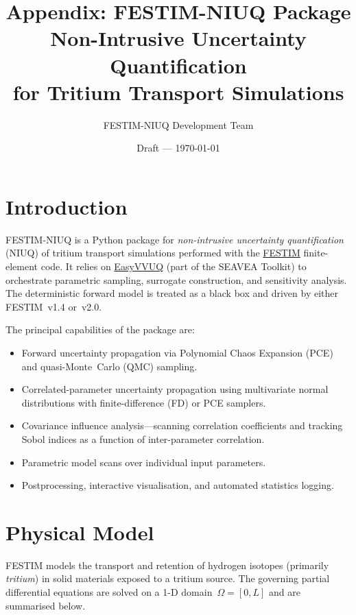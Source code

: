 \documentclass[11pt,a4paper]{article}
\title{%
  \textbf{Appendix: FESTIM-NIUQ Package}\\[4pt]
  \large Non-Intrusive Uncertainty Quantification\\
  for Tritium Transport Simulations%
}
\author{FESTIM-NIUQ Development Team}
\date{Draft — \today}
\begin{document}
\maketitle
\tableofcontents
\newpage

\section{Introduction}
\label{sec:intro}

FESTIM-NIUQ is a Python package for \emph{non-intrusive uncertainty
quantification} (NIUQ) of tritium transport simulations performed with the
\href{https://github.com/festim-dev/FESTIM}{FESTIM} finite-element code.
It relies on
\href{https://github.com/UCL-CCS/EasyVVUQ}{EasyVVUQ} (part of the SEAVEA
Toolkit) to orchestrate parametric sampling, surrogate construction, and
sensitivity analysis.  The deterministic forward model is treated as a
black box and driven by either FESTIM~v1.4 or~v2.0.

The principal capabilities of the package are:
\begin{itemize}[nosep]
  \item Forward uncertainty propagation via Polynomial Chaos Expansion (PCE)
        and quasi-Monte~Carlo (QMC) sampling.
  \item Correlated-parameter uncertainty propagation using multivariate
        normal distributions with finite-difference (FD) or PCE samplers.
  \item Covariance influence analysis---scanning correlation coefficients
        and tracking Sobol indices as a function of inter-parameter correlation.
  \item Parametric model scans over individual input parameters.
  \item Postprocessing, interactive visualisation, and automated statistics
        logging.
\end{itemize}


\section{Physical Model}
\label{sec:physics}

FESTIM models the transport and retention of hydrogen isotopes
(primarily \emph{tritium}) in solid materials exposed to a tritium source.
The governing partial differential equations are solved on a 1-D
domain~$\Omega = [0, L]$ and are summarised below.
\end{document}
